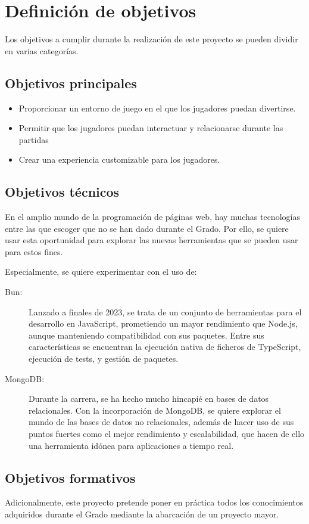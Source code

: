 \chapter{Definici\'on de objetivos}\label{defobjetivos}

Los objetivos a cumplir durante la realización de este proyecto se pueden	
dividir en varias categorías.

\section{Objetivos principales}

\begin{itemize}
  \item Proporcionar un entorno de juego en el que los jugadores
    puedan divertirse.
  \item Permitir que los jugadores puedan interactuar y relacionarse
    durante las partidas
  \item Crear una experiencia customizable para los jugadores.
\end{itemize}

\section{Objetivos técnicos}
En el amplio mundo de la programación de páginas web, hay
muchas tecnologías entre las que escoger que no se han dado
durante el Grado. 
Por ello, se quiere usar esta oportunidad para
explorar las nuevas herramientas que se pueden usar para estos fines.

Especialmente, se quiere experimentar con el uso de:
\begin{description}
  \item[Bun:] Lanzado a finales de 2023, se trata de un conjunto
    de herramientas para el desarrollo en JavaScript, prometiendo
    un mayor rendimiento que Node.js, aunque manteniendo compatibilidad con
    sus paquetes. Entre sus características se encuentran la ejecución nativa
    de ficheros de TypeScript, ejecución de tests, y gestión de paquetes.
  
  \item[MongoDB:] Durante la carrera, se ha hecho mucho hincapié en bases de datos
    relacionales. Con la incorporación de MongoDB, se quiere explorar el mundo
    de las bases de datos no relacionales, además de hacer uso de sus puntos
    fuertes como el mejor rendimiento y escalabilidad, que hacen de ello una herramienta
    idónea para aplicaciones a tiempo real.
\end{description}

\section{Objetivos formativos}
Adicionalmente, este proyecto pretende poner en práctica todos
los conocimientos adquiridos durante el Grado mediante la
abarcación de un proyecto mayor.

